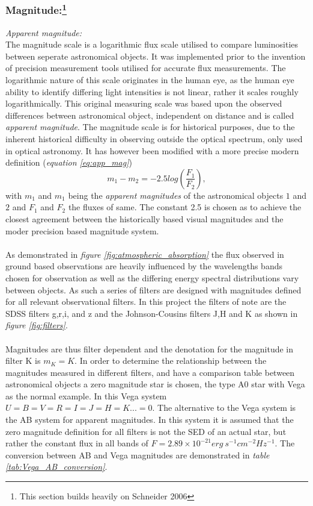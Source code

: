 \documentclass[a4paper, 12pt, twoside]{article}
\begin{document}
\subsubsection[Magnitude:]{Magnitude:\footnote{This section builds heavily on Schneider 2006}}
\emph{Apparent magnitude:} \\
The magnitude scale is a logarithmic flux scale utilised to compare luminosities between seperate astronomical objects. It was implemented prior to the invention of precision measurement tools utilised for accurate flux measurements. The logarithmic nature of this scale originates in the human eye, as the human eye ability to identify differing light intensities is not linear, rather it scales roughly logarithmically. This original measuring scale was based upon the observed differences between astronomical object, independent on distance and is called \emph{apparent magnitude}. The magnitude scale is for historical purposes, due to the inherent historical difficulty in observing outside the optical spectrum, only used in optical astronomy. It has however been modified with a more precise modern definition (\emph{equation \ref{eq:app_mag}}) 
\begin{equation}
m_{1} - m_{2} = -2.5log(\frac{F_{1}}{F_{2}}),
\label{eq:app_mag}
\end{equation}
with $m_{1}$ and $m_{1}$ being the \emph{apparent magnitudes} of the astronomical objects $1$ and $2$ and $F_{1}$ and $F_{2}$ the fluxes of same. The constant 2.5 is chosen as to achieve the closest agreement between the historically based visual magnitudes and the moder precision based magnitude system. \\
\\
As demonstrated in \emph{figure \ref{fig:atmospheric_absorption}} the flux observed in ground based observations are heavily influenced by the wavelengths bands chosen for observation as well as the differing energy spectral distributions vary between objects. As such a series of filters are designed with magnitudes defined for all relevant observational filters. In this project the filters of note are the SDSS filters g,r,i, and z and the Johnson-Cousins filters J,H and K as shown in \emph{figure \ref{fig:filters}}. \\
\\Magnitudes are thus filter dependent and the denotation for the magnitude in filter K is $m_{K}=K$. In order to determine the relationship between the magnitudes measured in different filters, and have a comparison table between astronomical objects a zero magnitude star is chosen, the type A0 star with Vega as the normal example. In this Vega system $U=B=V=R=I=J=H=K...=0$. The alternative to the Vega system is the AB system for apparent magnitudes. In this system it is assumed that the zero magnitude definition for all filters is not the SED of an actual star, but rather the constant flux in all bands of $F=2.89\times10^{-21}erg\ s^{-1}cm^{-2}Hz^{-1}$. The conversion between AB and Vega magnitudes are demonstrated in \emph{table \ref{tab:Vega_AB_conversion}}.\\
\end{document}
